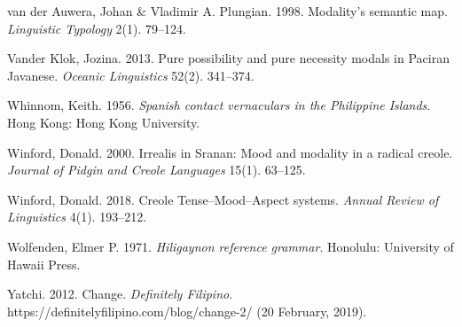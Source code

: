 \begin{styleBibliography}
van der Auwera, Johan \& Vladimir A. Plungian. 1998. Modality’s semantic map. \textit{Linguistic Typology} 2(1). 79–124.
\end{styleBibliography}

\begin{styleBibliography}
Vander Klok, Jozina. 2013. Pure possibility and pure necessity modals in Paciran Javanese. \textit{Oceanic Linguistics} 52(2). 341–374.
\end{styleBibliography}

\begin{styleBibliography}
Whinnom, Keith. 1956. \textit{Spanish contact vernaculars in the Philippine Islands}. Hong Kong: Hong Kong University.
\end{styleBibliography}

\begin{styleBibliography}
Winford, Donald. 2000. Irrealis in Sranan: Mood and modality in a radical creole. \textit{Journal of Pidgin and Creole Languages} 15(1). 63–125.
\end{styleBibliography}

\begin{styleBibliography}
Winford, Donald. 2018. Creole Tense–Mood–Aspect systems. \textit{Annual Review of Linguistics} 4(1). 193–212.
\end{styleBibliography}

\begin{styleBibliography}
Wolfenden, Elmer P. 1971. \textit{Hiligaynon reference grammar}. Honolulu: University of Hawaii Press.
\end{styleBibliography}

\begin{styleBibliography}
Yatchi. 2012. Change. \textit{Definitely Filipino}. https://definitelyfilipino.com/blog/change-2/ (20 February, 2019).
\end{styleBibliography}

